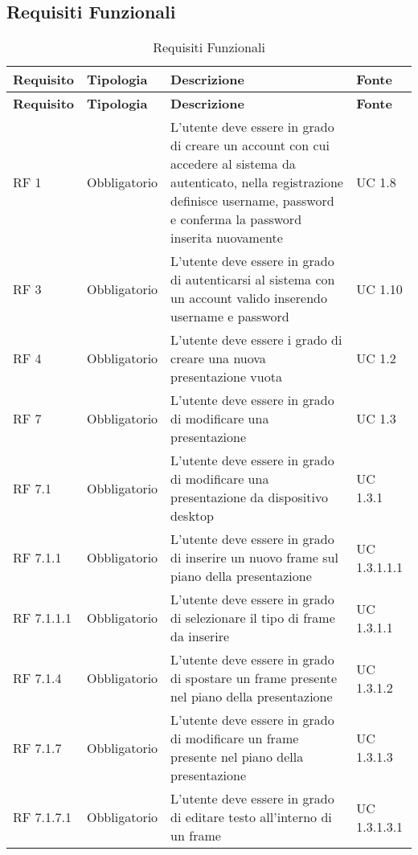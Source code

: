 \subsection{Requisiti Funzionali}{
		\renewcommand*{\arraystretch}{1.4}
		\begin{longtable} [c]{| p{2.5cm} | p{2.5cm} | p{6cm} |p{2.5cm}|}
			\caption{Requisiti Funzionali \label{tab:reqFunzionali}}\\
			 \hline
			 \textbf{Requisito} & \textbf{Tipologia} & \textbf{Descrizione} & \textbf{Fonte} \\
			 \hline
			 \endfirsthead
			 \hline
			 \textbf{Requisito} & \textbf{Tipologia} & \textbf{Descrizione} & \textbf{Fonte} \\
			 \hline
				\endhead
			 \hline
			 \endfoot
			 \hline
			 \endlastfoot
			RF 1 & Obbligatorio & L'utente deve essere in grado di creare un account con cui accedere al sistema da autenticato, nella registrazione definisce username, password e conferma la password inserita nuovamente & UC 1.8\\
			\hline
			RF 3 & Obbligatorio & L'utente deve essere in grado di autenticarsi al sistema con un account valido inserendo username e password & UC 1.10\\
			\hline
			RF 4 & Obbligatorio & L’utente deve essere i grado di creare una nuova presentazione vuota & UC 1.2\\
			\hline	
			RF 7 & Obbligatorio & L'utente deve essere in grado di modificare una presentazione & UC 1.3\\
			\hline
			RF 7.1 & Obbligatorio & L'utente deve essere in grado di modificare una presentazione da dispositivo desktop & UC 1.3.1\\						
			\hline
			RF 7.1.1 & Obbligatorio & L'utente deve essere in grado di inserire un nuovo frame sul piano della presentazione & UC 1.3.1.1.1\\
			\hline
			RF 7.1.1.1 & Obbligatorio & L'utente deve essere in grado di selezionare il tipo di frame da inserire & UC 1.3.1.1\\
			\hline
			RF 7.1.4 & Obbligatorio & L'utente deve essere in grado di spostare un frame presente nel piano della presentazione & UC 1.3.1.2\\
			\hline
			RF 7.1.7 & Obbligatorio & L'utente deve essere in grado di modificare un frame presente nel piano della presentazione & UC 1.3.1.3\\
			\hline
			RF 7.1.7.1 & Obbligatorio & L'utente deve essere in grado di editare testo all'interno di un frame & UC 1.3.1.3.1\\

\end{longtable}}

